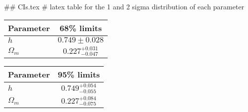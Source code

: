 ## CIs.tex
# latex table for the 1 and 2 sigma distribution of each parameter

\begin{tabular} { l  c}
 Parameter &  68\% limits\\
\hline
{\boldmath$h              $} & $0.749\pm 0.028            $\\
{\boldmath$\Omega_m       $} & $0.227^{+0.031}_{-0.047}   $\\
\hline
\end{tabular}

\begin{tabular} { l  c}
 Parameter &  95\% limits\\
\hline
{\boldmath$h              $} & $0.749^{+0.054}_{-0.055}   $\\
{\boldmath$\Omega_m       $} & $0.227^{+0.084}_{-0.075}   $\\
\hline
\end{tabular}
